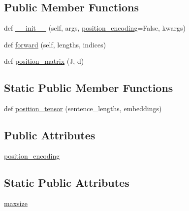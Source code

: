 \subsection*{Public Member Functions}
\begin{DoxyCompactItemize}
\item 
def \hyperlink{classprojects_1_1memnn__feedback_1_1agent_1_1modules_1_1Embed_aeb99af34ce2338cced068f77a499789f}{\+\_\+\+\_\+init\+\_\+\+\_\+} (self, args, \hyperlink{classprojects_1_1memnn__feedback_1_1agent_1_1modules_1_1Embed_a53464118dd2c6052e8ce44978c573c27}{position\+\_\+encoding}=False, kwargs)
\item 
def \hyperlink{classprojects_1_1memnn__feedback_1_1agent_1_1modules_1_1Embed_afb772fd0a940a5fe69a57613c45c898b}{forward} (self, lengths, indices)
\item 
def \hyperlink{classprojects_1_1memnn__feedback_1_1agent_1_1modules_1_1Embed_a493bb5875793e19802cfc1ed7abfdfaa}{position\+\_\+matrix} (J, d)
\end{DoxyCompactItemize}
\subsection*{Static Public Member Functions}
\begin{DoxyCompactItemize}
\item 
def \hyperlink{classprojects_1_1memnn__feedback_1_1agent_1_1modules_1_1Embed_a53662ab0fd08d06071b2321685a24723}{position\+\_\+tensor} (sentence\+\_\+lengths, embeddings)
\end{DoxyCompactItemize}
\subsection*{Public Attributes}
\begin{DoxyCompactItemize}
\item 
\hyperlink{classprojects_1_1memnn__feedback_1_1agent_1_1modules_1_1Embed_a53464118dd2c6052e8ce44978c573c27}{position\+\_\+encoding}
\end{DoxyCompactItemize}
\subsection*{Static Public Attributes}
\begin{DoxyCompactItemize}
\item 
\hyperlink{classprojects_1_1memnn__feedback_1_1agent_1_1modules_1_1Embed_a8daadcc50f9245d9814a62a860f10de9}{maxsize}
\end{DoxyCompactItemize}


